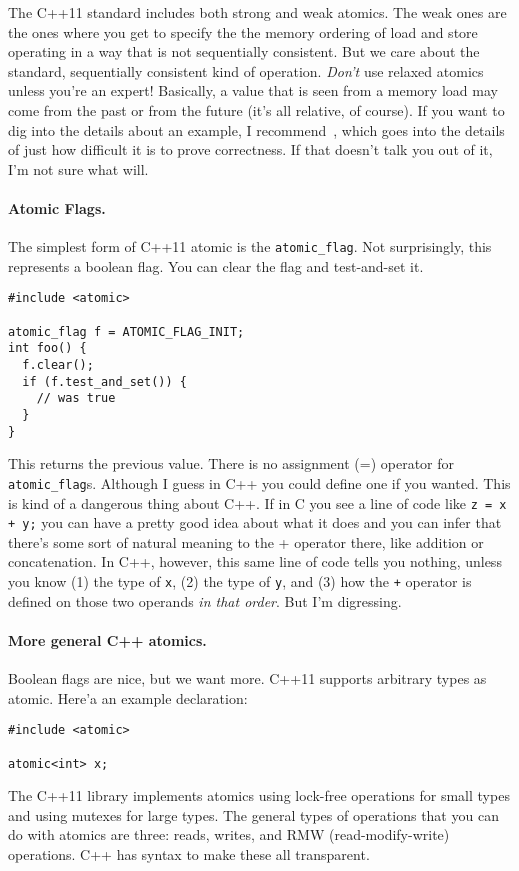 The C++11 standard includes both strong and weak atomics. The weak ones are the ones where you get to specify the the memory ordering of load and store operating in a way that is not sequentially consistent. But we care about the standard, sequentially consistent kind of operation. \textit{Don't} use relaxed atomics unless you're an expert! Basically, a value that is seen from a memory load may come from the past or from the future (it's all relative, of course). If you want to dig into the details about an example, I recommend~\cite{bmref2}, which goes into the details of just how difficult it is to prove correctness. If that doesn't talk you out of it, I'm not sure what will.


\paragraph{Atomic Flags.} The simplest form of C++11 atomic is the {\tt atomic\_flag}.
Not surprisingly, this represents a boolean flag. You can clear the flag and test-and-set it.


\begin{verbatim}
#include <atomic>

atomic_flag f = ATOMIC_FLAG_INIT;
int foo() {
  f.clear();
  if (f.test_and_set()) {
    // was true
  }
}
\end{verbatim}

This returns the previous value. There is no assignment (=) operator for {\tt atomic\_flag}s. Although I guess in C++ you could define one if you wanted. This is kind of a dangerous thing about C++. If in C you see a line of code like \texttt{z = x + y;} you can have a pretty good idea about what it does and you can infer that there's some sort of natural meaning to the + operator there, like addition or concatenation. In C++, however, this same line of code tells you nothing, unless you know (1) the type of \texttt{x}, (2) the type of \texttt{y}, and (3) how the \texttt{+} operator is defined on those two operands \textit{in that order}. But I'm digressing.

\paragraph{More general C++ atomics.} Boolean flags are nice, but we want more.
C++11 supports arbitrary types as atomic. Here'a an example declaration:
\begin{verbatim}
#include <atomic>

atomic<int> x;
\end{verbatim}
The C++11 library implements atomics using lock-free operations for small types
and using mutexes for large types. The general types of operations that you can do with atomics are three: reads, writes, and RMW (read-modify-write) operations. C++ has syntax to make these all transparent.

